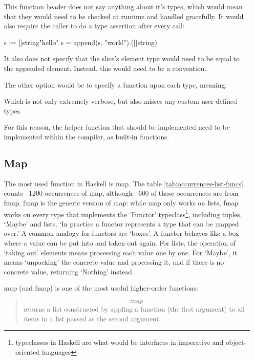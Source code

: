 This function header does not say anything about it's types, which would
mean that they would need to be checked at runtime and handled gracefully. It
would also require the caller to do a type assertion after every call:

\begin{gocode}
  s := []string{"hello"}
  s = append(s, "world").([]string)
\end{gocode}

It also does not specify that the slice's element type would need to be equal to
the appended element. Instead, this would need to be a convention.

The other option would be to specify a function upon each type, meaning:
\begin{gocode}
func appendInt(slice []int, elem ...int} []int
func appendString(slice []string, elem ...string} []string
...
\end{gocode}

Which is not only extremely verbose, but also misses any custom user-defined types.

For this reason, the helper function that should  be implemented need to
be implemented within the compiler, as built-in functions.

\subsection{Map}

The most used function in Haskell is map. The table \ref{tab:occurrences-list-funcs}
counts ~1200 occurrences of map, although ~600 of those occurrences are from
fmap. fmap is the generic version of map: while map only works on lists, fmap
works on every type that implements the `Functor' typeclass\footnote{typeclasses
    in Haskell are what would be interfaces in imperative and object-oriented
languages}, including tuples, `Maybe' and lists.
`In practice a functor represents a type that can be mapped over.'\autocite{functor-wiki}
A common analogy for functors are `boxes'. A functor behaves like a box where
a value can be put into and taken out again. For lists, the operation of `taking out'
elements means processing each value one by one. For `Maybe', it means `unpacking' the
concrete value and processing it, and if there is no concrete value, returning `Nothing'
instead.

map (and fmap) is one of the most useful higher-order functions:
\begin{quote}
    \[map\] returns a list constructed by appling a function (the first argument) to all
    items in a list passed as the second argument\autocite{haskell-map}.
\end{quote}

